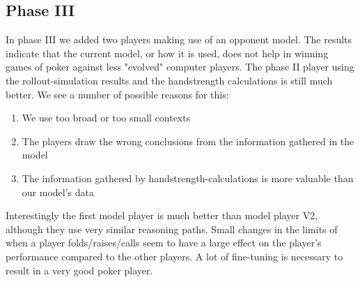 \subsection{Phase III}
In phase III we added two players making use of an opponent model. The results indicate that the current model, or how
it is used, does not help in winning games of poker against less "evolved" computer players. The phase II player using
the rollout-simulation results and the handstrength calculations is still much better.
We see a number of possible reasons for this:
\begin{enumerate}
    \item We use too broad or too small contexts
    \item The players draw the wrong conclusions from the information gathered in the model
    \item The information gathered by handstrength-calculations is more valuable than our model's data
\end{enumerate}

Interestingly the first model player is much better than model player V2, although they use very similar reasoning
paths. Small changes in the limits of when a player folds/raises/calls seem to have a large effect on the player's
performance compared to the other players. A lot of fine-tuning is necessary to result in a very good poker player.

